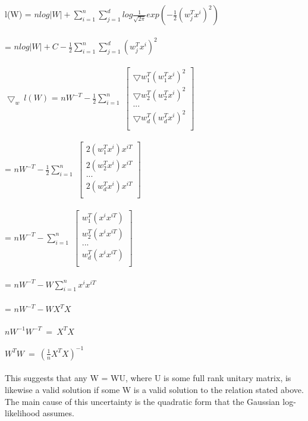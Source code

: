 \newcommand\tab[1][1cm]{\hspace*{#1}}
\begin{answer}
\\ \\
l(W) = $nlog|W| + \sum_{i=1}^n \sum_{j=1}^d log \frac{1}{\sqrt{2\pi}} exp (- \frac{1}{2} (w_j^Tx^i)^2 )$ \\ \\
\tab = $nlog|W| + C - \frac{1}{2} \sum_{i=1}^n \sum_{j=1}^d (w_j^Tx^i)^2 $ \\ \\
$\bigtriangledown_w \ l(W) $ = $nW^{-T} - \frac{1}{2} \sum_{i=1}^n  $ 
$\begin{bmatrix}
\bigtriangledown w_1^T (w_1^Tx^i)^2 \\
\bigtriangledown w_2^T (w_2^Tx^i)^2 \\
... \\ 
\bigtriangledown w_d^T (w_d^Tx^i)^2 \\
\end{bmatrix}$ \\ \\

\tab[2cm] = $nW^{-T} - \frac{1}{2} \sum_{i=1}^n  $ 
$\begin{bmatrix}
2 (w_1^Tx^i)x^{iT} \\
2 (w_2^Tx^i)x^{iT} \\
... \\ 
2 (w_d^Tx^i)x^{iT} \\
\end{bmatrix}$ \\ \\

\tab[2cm] = $nW^{-T} -  \sum_{i=1}^n  $ 
$\begin{bmatrix}
w_1^T(x^ix^{iT}) \\
w_2^T(x^ix^{iT}) \\
... \\ 
w_d^T(x^ix^{iT}) \\
\end{bmatrix}$ \\ \\

\tab[2cm] = $nW^{-T} -  W \sum_{i=1}^n  x^ix^{iT}$  \\ \\
\tab[2cm] = $nW^{-T} -  W X^T X$   \\ \\
$nW^{-1}W^{-T}  \ = \ X^T X $ \\ \\
$W^T W  \ = \ (\frac{1}{n}X^T X)^{-1} $\\ \\
This suggests that any W = WU, where U is some full rank unitary matrix, is likewise a valid solution if some W is a valid solution to the relation stated above. The main cause of this uncertainty is the quadratic form that the Gaussian log-likelihood assumes.
\end{answer}
